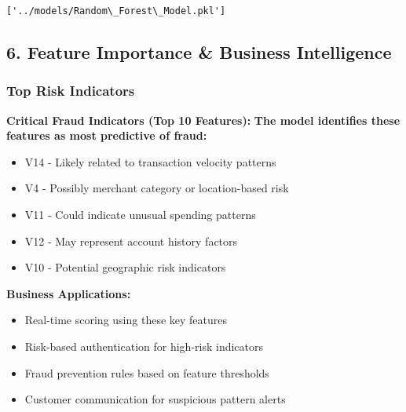 \documentclass[11pt]{article}
\makeatletter
\providecommand{\tightlist}{%
      \setlength{\itemsep}{0pt}\setlength{\parskip}{0pt}}
\newcommand{\boxspacing}{\kern\kvtcb@left@rule\kern\kvtcb@boxsep}
\newcommand{\prompt}[4]{
        {\ttfamily\llap{{\color{#2}[#3]:\hspace{3pt}#4}}\vspace{-\baselineskip}}
    }
\makeatother
\begin{document}
            \begin{tcolorbox}[breakable, size=fbox, boxrule=.5pt, pad at break*=1mm, opacityfill=0]
\prompt{Out}{outcolor}{25}{\boxspacing}
\begin{Verbatim}[commandchars=\\\{\}]
['../models/Random\_Forest\_Model.pkl']
\end{Verbatim}
\end{tcolorbox}
        
    \subsection{6. Feature Importance \& Business
Intelligence}\label{feature-importance-business-intelligence}

\subsubsection{Top Risk Indicators}\label{top-risk-indicators}

\textbf{Critical Fraud Indicators (Top 10 Features):} \textbf{The model
identifies these features as most predictive of fraud:}

\begin{itemize}
\tightlist
\item
  V14 - Likely related to transaction velocity patterns
\item
  V4 - Possibly merchant category or location-based risk
\item
  V11 - Could indicate unusual spending patterns
\item
  V12 - May represent account history factors
\item
  V10 - Potential geographic risk indicators
\end{itemize}

\textbf{Business Applications:}

\begin{itemize}
\tightlist
\item
  Real-time scoring using these key features
\item
  Risk-based authentication for high-risk indicators
\item
  Fraud prevention rules based on feature thresholds
\item
  Customer communication for suspicious pattern alerts
\end{itemize}
\end{document}
